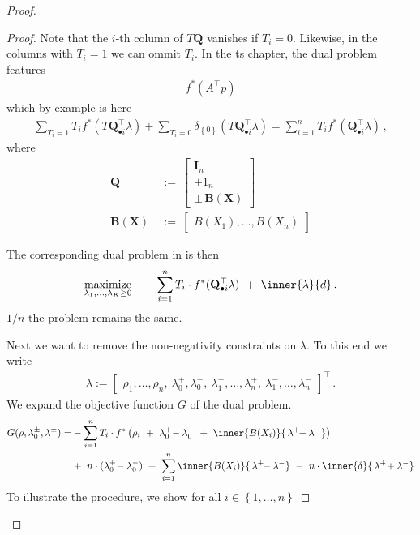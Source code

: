 \begin{proof}
\begin{proof}
Note that the $i$-th column of $T\mathbf{Q}$ vanishes if 
$T_i=0$. Likewise, in the columns with $T_i=1$ we can ommit $T_i$.
In the ts chapter, the dual problem features
\begin{gather}
  f^*(A^\top p)
\end{gather}
which by example is here
\begin{gather*}
  \sum_{T_i=1} T_i f^*(T\mathbf{Q}_{\bullet i}^\top\lambda)
  +
  \sum_{T_i=0} 
  \delta_{\left\{ 0 \right\}}
(T\mathbf{Q}_{\bullet i}^\top\lambda)
  =
  \sum_{i=1}^n T_i f^*(\mathbf{Q}_{\bullet i}^\top\lambda)
  \,,
\end{gather*}
where
\begin{align*}
    \mathbf{Q}
    &
    \ 
    :=
    \ 
    \begin{bmatrix}
      \mathbf{I}_n
      \\
      \pm
      \mathrm{1}_n
      \\
      \pm\,\mathbf{B}(\mathbf{X})
    \end{bmatrix}
    \\
    \mathbf{B}(\mathbf{X})
    &
    \ 
    :=
    \ 
    \begin{bmatrix}
      B(X_1), \ldots, B(X_n)
    \end{bmatrix}
\end{align*}


The corresponding dual problem in \cite{Tseng1991} is then
\begin{gather*}
  \underset
  {\lambda_1,\ldots,\lambda_{K}\ge 0}
  {
  \mathrm{maximize}
  }
  \quad
  -
  \sum_{i=1} 
  ^n
  T_i
  \cdot
  f^*
(\mathbf{Q}_{\bullet i}^\top\lambda)
  \ 
  +
  \ 
  \inner{\lambda}{d}
  \,.
\end{gather*}
  $1/n$ the problem remains the same.

  Next we want to remove the non-negativity constraints on $\lambda$.
  To this end we write
  \begin{gather}
    \lambda
    :=
    \begin{bmatrix}
      \rho_1,
      \ldots,
      \rho_n,
      \ 
      \lambda_0^+,
      \lambda_0^-,
      \ 
      \lambda_1^+,
      \ldots,
      \lambda_n^+,
      \ 
      \lambda_1^-,
      \ldots,
      \lambda_n^-
    \end{bmatrix}
    ^\top
    \,.
  \end{gather}
  We expand the objective function $G$ of the dual problem.
  \begin{align*}
    G
    (
    \rho,
    \lambda_0^\pm,
    \lambda^\pm
    )
    =
  &-
  \sum_{i=1} 
  ^n
  T_i
  \cdot
  f^*
  \left( 
\rho_i
\ 
+
\ 
\lambda_0^+
\!
-
\lambda_0^-
\ 
+
\ 
\inner
{B(X_i)}
{\,\lambda^+ \!\!- \lambda^-}
  \right)
  \\
  &+
  \ 
  n
  \cdot
  (
\lambda_0^+
\!
-
\lambda_0^-
  )
  \ 
+
  \ 
  \sum_{i=1} 
  ^n
\inner
{B(X_i)}
{\,\lambda^+ \!\!- \lambda^-}
  \ 
-
  \ 
  n
  \cdot
\inner
{\delta}
{\,\lambda^+ \!+ \lambda^-}
  \end{align*}
  To illustrate the procedure, we show 
  for all $i \in \left\{ 1,\ldots,n \right\}$



\end{proof}
\end{proof}
